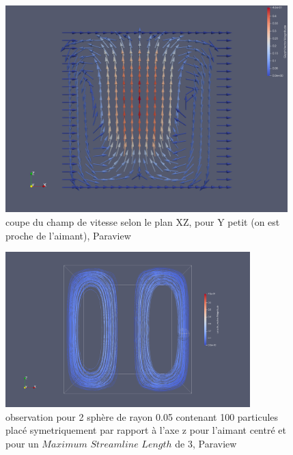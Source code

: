 \documentclass[a4paper,12pt,titlepage]{report}
\begin{document}
\begin{onehalfspace}
\begin{figure}[!h]
\begin{center}
\includegraphics[height = 8cm, keepaspectratio]{graphes/Paraview/coupe_aimant_centre.png} 
\caption{\label{figure 31 } coupe du champ de vitesse selon le plan XZ, pour Y petit (on est proche de l'aimant), Paraview}
\end{center}
\end{figure}



\begin{figure}[!h]
\begin{center}
\includegraphics[height = 6cm, keepaspectratio]{graphes/Paraview/flux_aimant_centre_100pt_length4.png} 
\caption{\label{figure 32 }observation pour 2 sphère de rayon 0.05 contenant 100 particules  placé symetriquement par rapport à l'axe z pour l'aimant centré et pour un $Maximum$ $Streamline$ $Length$ de 3, Paraview}
\end{center}
\end{figure}


\end{onehalfspace}
\end{document}
